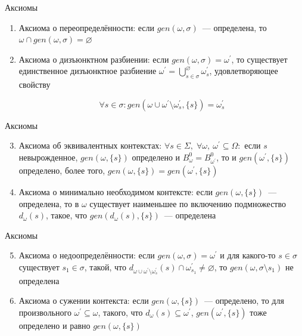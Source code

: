 \begin{frame}{Аксиомы}
\begin{enumerate}
	\item Аксиома о переопределённости: если $gen(\omega,\sigma)$~--- определена, то $\omega\cap gen(\omega,\sigma) = \varnothing$
	
	\item Аксиома о дизъюнктном разбиении: если $gen(\omega,\sigma) = \omega^\prime$, то существует единственное дизъюнктное разбиение $\omega^\prime=\bigcup^\varnothing_{s\in\sigma}\omega^\prime_s$, 
	удовлетворяющее свойству 

	$$\forall s\in\sigma : gen(\omega\cup\omega^\prime\setminus\omega^\prime_s,\{s\})=\omega^\prime_s$$
\end{enumerate}
\end{frame}

\begin{frame}{Аксиомы}
\begin{enumerate}
	\setcounter{enumi}{2}
	\item Аксиома об эквивалентных контекстах: $\forall s\in\Sigma,\; \forall\omega,\:\omega^\prime\subseteq\Omega:$ если $s$ невырожденное, $gen(\omega,\{s\})$ определено и $B^0_{\omega} = B^0_{\omega^\prime}$, то и $gen(\omega^\prime,\{s\})$ определено, более того, $gen(\omega,\{s\}) = gen(\omega^\prime,\{s\})$

	\item Аксиома о минимально необходимом контексте: если $gen(\omega,\{s\})$~--- определена, то в $\omega$ существует наименьшее по включению подмножество $d_\omega(s)$, такое, что $gen(d_\omega(s), \{s\})$~--- определена
\end{enumerate}
\end{frame}

\begin{frame}{Аксиомы}
\begin{enumerate}
	\setcounter{enumi}{4}
	\item Аксиома о недоопределённости: если $gen(\omega, \sigma) = \omega^\prime$ и для какого-то $s\in\sigma$ существует $s_1\in\sigma$, такой, что $d_{\omega\cup\omega^\prime\setminus\omega^\prime_s}(s) \cap \omega^\prime_{s_1}\ne\varnothing$, то $gen(\omega, \sigma\setminus s_1)$ не определена
	
	\item Аксиома о сужении контекста: если $gen(\omega,\{s\})$~--- определено, то для произвольного $\omega^\prime\subseteq\omega$, такого, что $d_\omega(s)\subseteq\omega^\prime$, $gen(\omega^\prime, \{s\})$ тоже определено и равно $gen(\omega,\{s\})$
\end{enumerate}
\end{frame}

